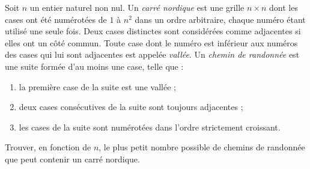 Soit $n$ un entier naturel non nul. Un \emph{carré nordique} est une grille $n \times n$ dont les cases ont
été numérotées de $1$ à $n^2$ dans un ordre arbitraire, chaque numéro étant utilisé une seule fois. Deux
cases distinctes sont considérées comme adjacentes si elles ont un côté commun. Toute case dont le numéro
est inférieur aux numéros des cases qui lui sont adjacentes est appelée \emph{vallée}.
Un \emph{chemin de randonnée} est une suite formée d'au moins une case, telle que :
\begin{enumerate}
  \item[(i)] la première case de la suite est une vallée ;
  \item[(ii)] deux cases consécutives de la suite sont toujours adjacentes ;
  \item[(iii)] les cases de la suite sont numérotées dans l'ordre strictement croissant.
\end{enumerate}
Trouver, en fonction de $n$, le plus petit nombre possible de chemins de randonnée que peut contenir un
carré nordique.
